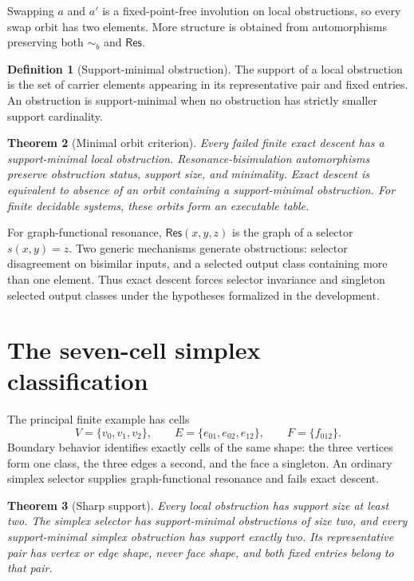 \documentclass[11pt]{article}
\newtheorem{theorem}{Theorem}[section]
\theoremstyle{definition}
\newtheorem{definition}[theorem]{Definition}
\newcommand{\Res}{\mathsf{Res}}
\newcommand{\Bis}{\mathrel{\sim_{\!b}}}
\begin{document}
Swapping $a$ and $a'$ is a fixed-point-free involution on local obstructions, so
every swap orbit has two elements.  More structure is obtained from
automorphisms preserving both $\Bis$ and $\Res$.

\begin{definition}[Support-minimal obstruction]
The support of a local obstruction is the set of carrier elements appearing in
its representative pair and fixed entries.  An obstruction is support-minimal
when no obstruction has strictly smaller support cardinality.
\end{definition}

\begin{theorem}[Minimal orbit criterion]\label{thm:minimal-orbit}
Every failed finite exact descent has a support-minimal local obstruction.
Resonance-bisimulation automorphisms preserve obstruction status, support size,
and minimality.  Exact descent is equivalent to absence of an orbit containing
a support-minimal obstruction.  For finite decidable systems, these orbits form
an executable table.
\end{theorem}

For graph-functional resonance, $\Res(x,y,z)$ is the graph of a selector
$s(x,y)=z$.  Two generic mechanisms generate obstructions: selector disagreement
on bisimilar inputs, and a selected output class containing more than one
element.  Thus exact descent forces selector invariance and singleton selected
output classes under the hypotheses formalized in the development.

\section{The seven-cell simplex classification}

The principal finite example has cells
\[
V=\{v_0,v_1,v_2\},\qquad
E=\{e_{01},e_{02},e_{12}\},\qquad
F=\{f_{012}\}.
\]
Boundary behavior identifies exactly cells of the same shape: the three
vertices form one class, the three edges a second, and the face a singleton.
An ordinary simplex selector supplies graph-functional resonance and fails
exact descent.

\begin{theorem}[Sharp support]\label{thm:support-two}
Every local obstruction has support size at least two.  The simplex selector
has support-minimal obstructions of size two, and every support-minimal simplex
obstruction has support exactly two.  Its representative pair has vertex or
edge shape, never face shape, and both fixed entries belong to that pair.
\end{theorem}
\end{document}
